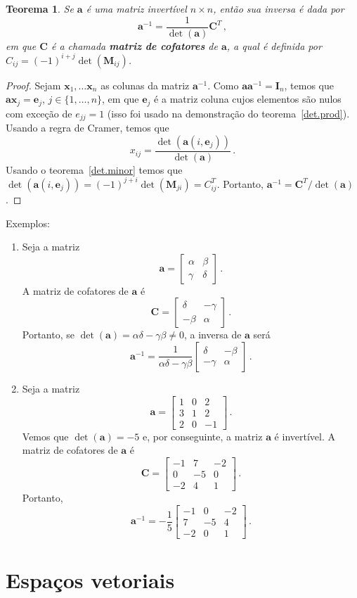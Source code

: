 \documentclass[12pt,a4paper]{report}
\newcommand{\tb}{\textbf}
\newcommand{\tbu}[1]{\tb{\textup{#1}}}
\newcommand{\mb}{\mathbf}
\newtheorem{thm}{Teorema}[chapter]
\begin{document}
\begin{thm}
  Se $\mb a$ é uma matriz invertível $n\times n$, então sua inversa é dada por
  $$\mb a^{-1}=\frac{1}{\det(\mb a)}\mb C^T\,,$$
  em que $\mb C$ é a chamada \tbu{matriz de cofatores} de $\mb a$, a qual é definida por $C_{ij}=(-1)^{i+j}\det(\mb M_{ij})$.
\end{thm}
\begin{proof}
  Sejam $\mb x_1,\ldots\mb x_n$ as colunas da matriz $\mb a^{-1}$. Como $\mb a\mb a^{-1}=\mb I_n$, temos que $\mb a\mb x_j=\mb e_j$, $j\in\{1,\ldots,n\}$, em que $\mb e_j$ é a matriz coluna cujos elementos são nulos com exceção de $e_{jj}=1$ (isso foi usado na demonstração do teorema~\ref{det.prod}). Usando a regra de Cramer, temos que
  $$x_{ij}=\frac{\det(\mb a(i,\mb e_j))}{\det(\mb a)}\,.$$
  Usando o teorema~\ref{det.minor} temos que $\det(\mb a(i,\mb e_j))=(-1)^{j+i}\det(\mb M_{ji})=C_{ij}^T$. Portanto, $\mb a^{-1}=\mb C^T/\det(\mb a)$.
\end{proof}

Exemplos:
\begin{enumerate}
  \item Seja a matriz
  $$\mb a=\begin{bmatrix}
    \alpha&\beta\\
    \gamma&\delta
  \end{bmatrix}\,.$$
  A matriz de cofatores de $\mb a$ é
  $$\mb C=\begin{bmatrix}
    \delta&-\gamma\\
    -\beta&\alpha
  \end{bmatrix}\,.$$
  Portanto, se $\det(\mb a)=\alpha\delta-\gamma\beta\ne 0$, a inversa de $\mb a$ será
  $$\mb a^{-1}=\frac{1}{\alpha\delta-\gamma\beta}\begin{bmatrix}
    \delta&-\beta\\
    -\gamma&\alpha
  \end{bmatrix}\,.$$
  \item Seja a matriz
  $$\mb a=\begin{bmatrix}
    1&0&2\\
    3&1&2\\
    2&0&-1
  \end{bmatrix}\,.$$
  Vemos que $\det(\mb a)=-5$ e, por conseguinte, a matriz $\mb a$ é invertível. A matriz de cofatores de $\mb a$ é
  $$\mb C=\begin{bmatrix}
    -1&7&-2\\
    0&-5&0\\
    -2&4&1
  \end{bmatrix}\,.$$
  Portanto,
  $$\mb a^{-1}=-\frac{1}{5}\begin{bmatrix}
    -1&0&-2\\
    7&-5&4\\
    -2&0&1
  \end{bmatrix}\,.$$
\end{enumerate}

\chapter{Espaços vetoriais}
\end{document}
